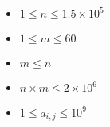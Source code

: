 \begin{itemize}
\tightlist
\item $1 \leq n \leq 1.5 \times 10^5$
\item $1 \leq m \leq 60$
\item $m \leq n$
\item $n \times m \leq 2 \times 10^6$
\item $1 \leq a_{i,j} \leq 10^9$
\end{itemize}
